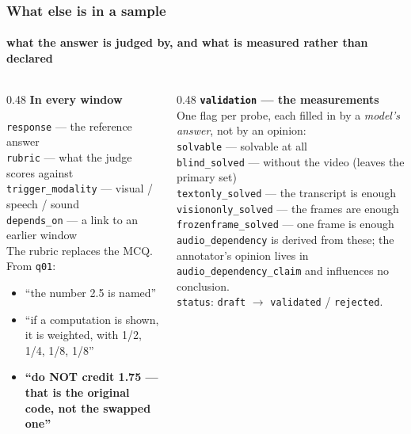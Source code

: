 \documentclass[aspectratio=169,10pt]{beamer}
\newcommand{\lead}[1]{{\color{warm}\textbf{#1}}}
\begin{document}
\begin{frame}
  \frametitle{What else is in a sample}
  \framesubtitle{what the answer is judged by, and what is measured rather than declared}

  \begin{columns}[T]
    \begin{column}{0.48\textwidth}
      {\bfseries In every window}\\[0.3em]
      {\small
      \texttt{response} — the reference answer\\
      \texttt{rubric} — what the judge scores against\\
      \texttt{trigger\_modality} — visual / speech / sound\\
      \texttt{depends\_on} — a link to an earlier window\\[0.5em]
      The rubric replaces the MCQ. From \texttt{q01}:
      \begin{itemize}\setlength{\itemsep}{0pt}
        \item[] ``the number 2.5 is named''
        \item[] ``if a computation is shown, it is weighted, with 1/2, 1/4, 1/8, 1/8''
        \item[] \lead{``do NOT credit 1.75 — that is the original code, not the swapped one''}
      \end{itemize}}
    \end{column}
    \begin{column}{0.48\textwidth}
      {\bfseries \texttt{validation} — the measurements}\\[0.3em]
      {\small
      One flag per probe, each filled in by a \emph{model's answer}, not by an opinion:\\[0.2em]
      \texttt{solvable} — solvable at all\\
      \texttt{blind\_solved} — without the video (leaves the primary set)\\
      \texttt{textonly\_solved} — the transcript is enough\\
      \texttt{visiononly\_solved} — the frames are enough\\
      \texttt{frozenframe\_solved} — one frame is enough\\[0.5em]
      \texttt{audio\_dependency} is derived from these; the annotator's opinion lives in
      \texttt{audio\_dependency\_claim} and influences no conclusion.\\[0.3em]
      \texttt{status}: \texttt{draft} $\rightarrow$ \texttt{validated} / \texttt{rejected}.}
    \end{column}
  \end{columns}
\end{frame}
\end{document}
